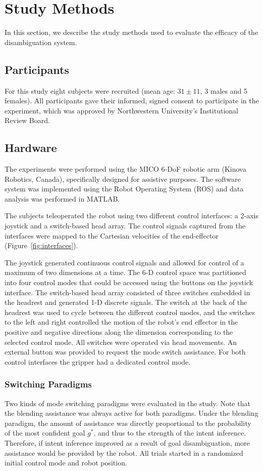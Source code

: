 \section{Study Methods}\label{sec:ed}
In this section, we describe the study methods used to evaluate the efficacy of the disambiguation system. 
\subsection{Participants}
For this study eight subjects were recruited (mean age: $31 \pm 11$, 3 males and 5 females). All participants gave their informed, signed consent to participate in the experiment, which was approved by Northwestern University's Institutional Review Board.
\subsection{Hardware}\label{ssec:hardware}
The experiments were performed using the MICO 6-DoF robotic arm (Kinova Robotics, Canada), specifically designed for assistive purposes. The software system was implemented using the Robot Operating System (ROS) and data analysis was performed in MATLAB. 


The subjects teleoperated the robot using two different control interfaces: a 2-axis joystick and a switch-based head array. The control signals captured from the interfaces were mapped to the Cartesian velocities of the end-effector (Figure~\ref{fig:interfaces}).

The joystick generated continuous control signals and allowed for control of a maximum of two dimensions at a time. The 6-D control space was partitioned into four control modes that could be accessed using the buttons on the joystick interface. The switch-based head array consisted of three switches embedded in the headrest and generated 1-D discrete signals. The switch at the back of the headrest was used to cycle between the different control modes, and the switches to the left and right controlled the motion of the robot's end effector in the positive and negative directions along the dimension corresponding to the selected control mode. All switches were operated via head movements.
An external button was provided to request the mode switch assistance. For both control interfaces the gripper had a dedicated control mode. 

\subsubsection{Switching Paradigms}
Two kinds of mode switching paradigms were evaluated in the study. Note that the blending assistance was always active for both paradigms. Under the blending paradigm, the amount of assistance was directly proportional to the probability of the most confident goal $g^*$, and thus to the strength of the intent inference. Therefore, if intent inference improved as a result of goal disambiguation, more assistance would be provided by the robot. All trials started in a randomized initial control mode and robot position. 

